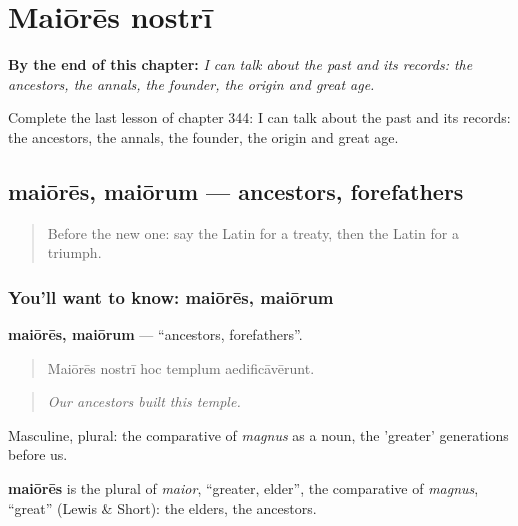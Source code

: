
\chapter{Maiōrēs nostrī}
\label{ch:la-maiores-nostri}

\begin{chapteropening}
\textbf{By the end of this chapter:} \emph{I can talk about the past and its records: the ancestors, the annals, the founder, the origin and great age.}

Complete the last lesson of chapter 344: I can talk about the past and its records: the ancestors, the annals, the founder, the origin and great age.
\end{chapteropening}

\section[maiōrēs, maiōrum]{maiōrēs, maiōrum — ancestors, forefathers}

\label{lesson:LA-C344-maiores}



\begin{quote}
Before the new one: say the Latin for a treaty, then the Latin for a triumph.
\end{quote}

\subsection*{You'll want to know: maiōrēs, maiōrum}
\textbf{maiōrēs, maiōrum} — \textquotedblleft{}ancestors, forefathers\textquotedblright{}.

\begin{quote}
Maiōrēs nostrī hoc templum aedificāvērunt.
\end{quote}

\begin{quote}
\emph{Our ancestors built this temple.}
\end{quote}

Masculine, plural: the comparative of \emph{magnus} as a noun, the 'greater' generations before us.

\begin{cousinweb}
\textbf{maiōrēs} is the plural of \emph{maior}, \textquotedblleft{}greater, elder\textquotedblright{}, the comparative of \emph{magnus}, \textquotedblleft{}great\textquotedblright{} (Lewis \& Short): the elders, the ancestors.
\end{cousinweb}

